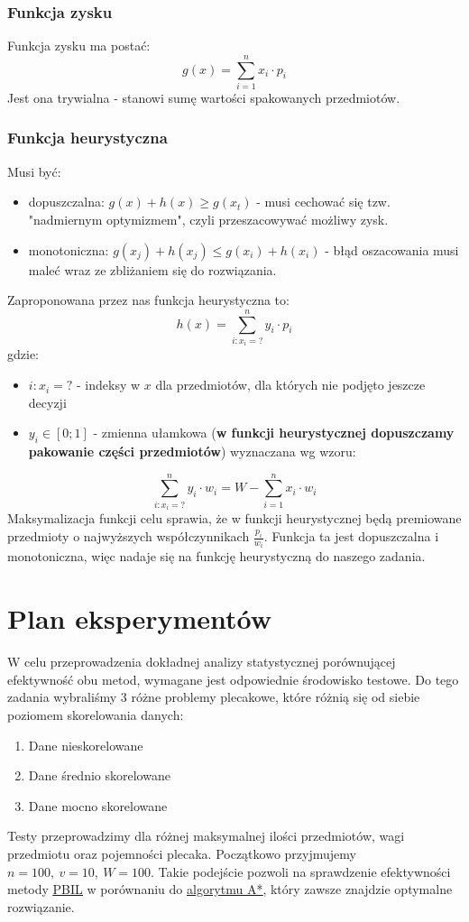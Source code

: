 \documentclass[11pt]{article}
\begin{document}
\subsubsection{Funkcja zysku}
\label{sec:orgf97f734}

Funkcja zysku ma postać:
$$
g(x) = \sum_{i = 1}^n x_i \cdot p_i
$$
Jest ona trywialna - stanowi sumę wartości spakowanych przedmiotów.
\subsubsection{Funkcja heurystyczna}
\label{sec:org8963b0e}
Musi być:
\begin{itemize}
\item dopuszczalna: $g(x) + h(x) \ge g(x_t)$ - musi cechować się tzw. "nadmiernym optymizmem", czyli przeszacowywać możliwy zysk.
\item monotoniczna: $g(x_j)+h(x_j) \le g(x_i) + h(x_i)$ - błąd oszacowania musi maleć wraz ze zbliżaniem się do rozwiązania.
\end{itemize}
Zaproponowana przez nas funkcja heurystyczna to:
$$
h(x) = \sum_{i:x_i=?}^n y_i \cdot p_i
$$
gdzie:
\begin{itemize}
\item $i: x_i = ?$ - indeksy w $x$ dla przedmiotów, dla których nie podjęto jeszcze decyzji
\item $y_i \in [0;1]$ - zmienna ułamkowa (\textbf{w funkcji heurystycznej dopuszczamy pakowanie części przedmiotów}) wyznaczana wg wzoru:
\end{itemize}
$$
\sum_{i:x_i=?}^n y_i \cdot w_i = W - \sum_{i=1}^n x_i \cdot w_i
$$
Maksymalizacja funkcji celu sprawia, że w funkcji heurystycznej będą premiowane przedmioty o najwyższych współczynnikach $\frac{p_i}{w_i}$. Funkcja ta jest dopuszczalna i monotoniczna, więc nadaje się na funkcję heurystyczną do naszego zadania.

\section{Plan eksperymentów}
\label{sec:org78ee836}
W celu przeprowadzenia dokładnej analizy statystycznej porównującej efektywność obu metod, wymagane jest odpowiednie środowisko testowe. Do tego zadania wybraliśmy 3 różne problemy plecakowe, które różnią się od siebie poziomem skorelowania danych:
\begin{enumerate}
\item Dane nieskorelowane
\item Dane średnio skorelowane
\item Dane mocno skorelowane
\end{enumerate}
Testy przeprowadzimy dla różnej maksymalnej ilości przedmiotów, wagi przedmiotu oraz pojemności plecaka. Początkowo przyjmujemy $n = 100,\ v = 10,\ W = 100$. Takie podejście pozwoli na sprawdzenie efektywności metody \uline{\hyperref[sec:org5c31017]{PBIL}} w porównaniu do \hyperref[sec:orgd1b064a]{\uline{algorytmu A*}}, który zawsze znajdzie optymalne rozwiązanie. 
\end{document}
